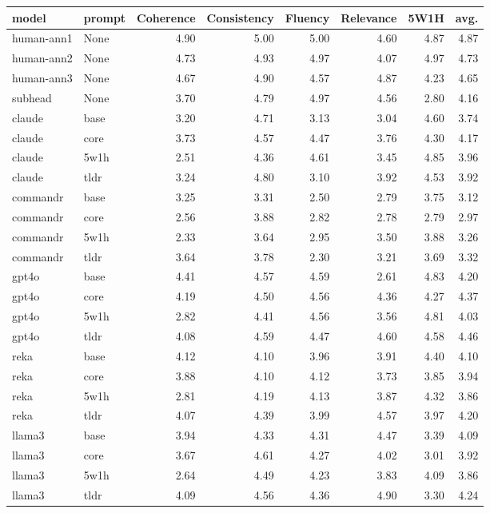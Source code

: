 \begin{tabular}{llrrrrrr}
\toprule
model & prompt & Coherence & Consistency & Fluency & Relevance & 5W1H & avg. \\
\midrule
human-ann1 & None & 4.90 & 5.00 & 5.00 & 4.60 & 4.87 & 4.87 \\
human-ann2 & None & 4.73 & 4.93 & 4.97 & 4.07 & 4.97 & 4.73 \\
human-ann3 & None & 4.67 & 4.90 & 4.57 & 4.87 & 4.23 & 4.65 \\
subhead & None & 3.70 & 4.79 & 4.97 & 4.56 & 2.80 & 4.16 \\
claude & base & 3.20 & 4.71 & 3.13 & 3.04 & 4.60 & 3.74 \\
claude & core & 3.73 & 4.57 & 4.47 & 3.76 & 4.30 & 4.17 \\
claude & 5w1h & 2.51 & 4.36 & 4.61 & 3.45 & 4.85 & 3.96 \\
claude & tldr & 3.24 & 4.80 & 3.10 & 3.92 & 4.53 & 3.92 \\
commandr & base & 3.25 & 3.31 & 2.50 & 2.79 & 3.75 & 3.12 \\
commandr & core & 2.56 & 3.88 & 2.82 & 2.78 & 2.79 & 2.97 \\
commandr & 5w1h & 2.33 & 3.64 & 2.95 & 3.50 & 3.88 & 3.26 \\
commandr & tldr & 3.64 & 3.78 & 2.30 & 3.21 & 3.69 & 3.32 \\
gpt4o & base & 4.41 & 4.57 & 4.59 & 2.61 & 4.83 & 4.20 \\
gpt4o & core & 4.19 & 4.50 & 4.56 & 4.36 & 4.27 & 4.37 \\
gpt4o & 5w1h & 2.82 & 4.41 & 4.56 & 3.56 & 4.81 & 4.03 \\
gpt4o & tldr & 4.08 & 4.59 & 4.47 & 4.60 & 4.58 & 4.46 \\
reka & base & 4.12 & 4.10 & 3.96 & 3.91 & 4.40 & 4.10 \\
reka & core & 3.88 & 4.10 & 4.12 & 3.73 & 3.85 & 3.94 \\
reka & 5w1h & 2.81 & 4.19 & 4.13 & 3.87 & 4.32 & 3.86 \\
reka & tldr & 4.07 & 4.39 & 3.99 & 4.57 & 3.97 & 4.20 \\
llama3 & base & 3.94 & 4.33 & 4.31 & 4.47 & 3.39 & 4.09 \\
llama3 & core & 3.67 & 4.61 & 4.27 & 4.02 & 3.01 & 3.92 \\
llama3 & 5w1h & 2.64 & 4.49 & 4.23 & 3.83 & 4.09 & 3.86 \\
llama3 & tldr & 4.09 & 4.56 & 4.36 & 4.90 & 3.30 & 4.24 \\
\bottomrule
\end{tabular}
